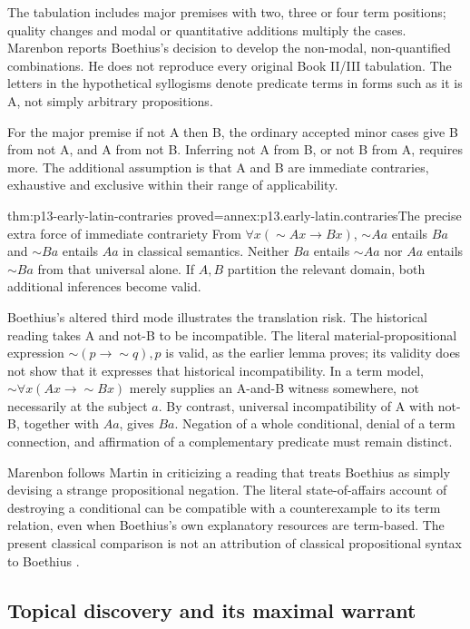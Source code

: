 The tabulation includes major premises with two, three or four term
positions; quality changes and modal or quantitative additions multiply
the cases. Marenbon reports Boethius's decision to develop the
non-modal, non-quantified combinations. He does not reproduce
every original Book II/III tabulation.
The letters in the hypothetical syllogisms denote predicate terms
in forms such as it is A, not simply arbitrary propositions.

For the major premise if not A then B, the ordinary accepted
minor cases give B from not A, and A from not B.
Inferring not A from B, or not B from A, requires more.
The additional assumption is that A and B are immediate contraries,
exhaustive and exclusive within their range of applicability.

\begin{hblemma}{thm:p13-early-latin-contraries}
 {proved=annex:p13.early-latin.contraries}{The precise extra force of immediate contrariety}
From \(\forall x(\sim Ax\to Bx)\), \(\sim Aa\) entails \(Ba\)
and \(\sim Ba\) entails \(Aa\) in classical semantics.
Neither \(Ba\) entails \(\sim Aa\) nor \(Aa\) entails \(\sim Ba\)
from that universal alone. If \(A,B\) partition the relevant domain,
both additional inferences become valid.
\end{hblemma}

Boethius's altered third mode illustrates the translation risk.
The historical reading takes A and not-B to be incompatible.
The literal material-propositional expression
\(\sim(p\to\sim q),p\) is valid, as the earlier lemma proves;
its validity does not show that it expresses that historical
incompatibility. In a term model,
\(\sim\forall x(Ax\to\sim Bx)\) merely supplies an A-and-B
witness somewhere, not necessarily at the subject \(a\).
By contrast, universal incompatibility of A with not-B, together
with \(Aa\), gives \(Ba\).
Negation of a whole conditional, denial of a term connection,
and affirmation of a complementary predicate must remain distinct.

Marenbon follows Martin in criticizing a reading that treats Boethius
as simply devising a strange propositional negation. The literal
state-of-affairs account of destroying a conditional can be
compatible with a counterexample to its term relation, even when
Boethius's own explanatory resources are term-based.
The present classical comparison is not an attribution of classical
propositional syntax to Boethius
\cite[pp.~15--18]{Marenbon2007FordhamEarlyLatin}.

\subsection{Topical discovery and its maximal warrant}

